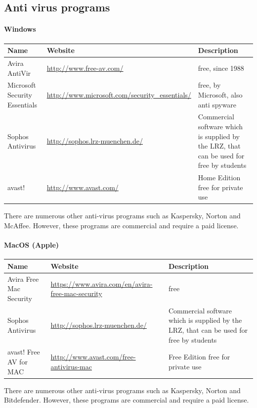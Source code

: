 \documentclass[a4paper,12pt]{scrartcl}
\begin{document}
\subsection*{Anti virus programs}
\paragraph*{Windows}
\begin{center}
  \begin{tabularx}{\linewidth}{|p{.2\linewidth}XX|}
    \hline
    Name & Website & Description\\
    \hline \hline
    Avira AntiVir & \url{http://www.free-av.com/} & free, since 1988\\
    \hline
    Microsoft Security Essentials & \url{http://www.microsoft.com/security\_essentials/} & free, by Microsoft, also anti spyware\\
    \hline
    Sophos Antivirus & \url{http://sophos.lrz-muenchen.de/} & Commercial software which is supplied by the LRZ, that can be used for free by students\\
    \hline
    avast! & \url{http://www.avast.com/} & Home Edition free for private use\\
    \hline
  \end{tabularx}
\end{center}
There are numerous other anti-virus programs such as Kaspersky, Norton and McAffee. However, these programs are commercial and require a paid license.
\\
\paragraph*{MacOS (Apple)}
\begin{center}
  \begin{tabularx}{\linewidth}{|p{.2\linewidth}XX|}
    \hline
    Name & Website & Description\\
    \hline \hline
    Avira Free Mac Security & \url{https://www.avira.com/en/avira-free-mac-security} & free\\
    \hline
    Sophos Antivirus & \url{http://sophos.lrz-muenchen.de/} & Commercial software which is supplied by the LRZ, that can be used for free by students\\
    \hline
    avast! Free AV for MAC & \url{http://www.avast.com/free-antivirus-mac} & Free Edition free for private use\\
    \hline
  \end{tabularx}
\end{center}
There are numerous other anti-virus programs such as Kaspersky, Norton and Bitdefender. However, these programs are commercial and require a paid license.
\end{document}

